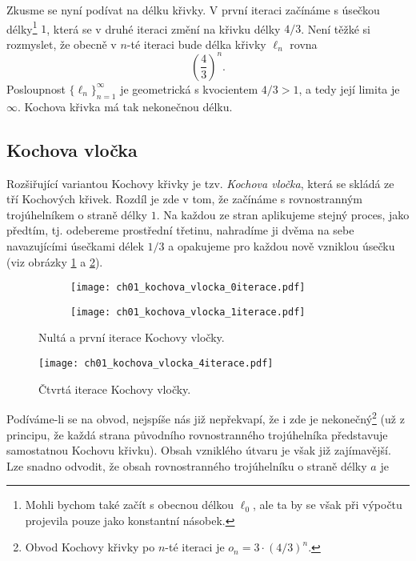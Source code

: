 Zkusme se nyní podívat na délku křivky. V první iteraci začínáme s úsečkou délky\footnote{Mohli bychom také začít s obecnou délkou $\ell_0$, ale ta by se však při výpočtu projevila pouze jako konstantní násobek.} $1$, která se v druhé iteraci změní na křivku délky $4/3$. Není těžké si rozmyslet, že obecně v $n$-té iteraci bude délka křivky $\ell_n$ rovna
\begin{equation*}
    \left(\dfrac{4}{3}\right)^{n}.
\end{equation*}
Posloupnost $\{\ell_n\}_{n=1}^{\infty}$ je geometrická s kvocientem $4/3>1$, a tedy její limita je $\infty$. Kochova křivka má tak nekonečnou délku.


\subsection{Kochova vločka}\label{subsec:kochova_vlocka}
Rozšiřující variantou Kochovy křivky je tzv. \emph{Kochova vločka}, která se skládá ze tří Kochových křivek. Rozdíl je zde v tom, že začínáme s rovnostranným trojúhelníkem o straně délky $1$. Na každou ze stran aplikujeme stejný proces, jako předtím, tj. odebereme prostřední třetinu, nahradíme ji dvěma na sebe navazujícími úsečkami délek $1/3$ a opakujeme pro každou nově vzniklou úsečku (viz obrázky \ref{fig:kochova_vlocka_dve_iterace} a \ref{fig:kochova_krivka_5iterace}).
\begin{figure}[h]
    \centering
    \begin{subfigure}{\subfigwidth}
        \centering
        \texttt{[image: ch01\_kochova\_vlocka\_0iterace.pdf]}
    \end{subfigure}
    \qquad
    \begin{subfigure}{\subfigwidth}
        \centering
        \texttt{[image: ch01\_kochova\_vlocka\_1iterace.pdf]}
    \end{subfigure}
    \caption{Nultá a první iterace Kochovy vločky.}
    \label{fig:kochova_vlocka_dve_iterace}
\end{figure}
\begin{figure}[h]
    \centering
    \texttt{[image: ch01\_kochova\_vlocka\_4iterace.pdf]}
    \caption{Čtvrtá iterace Kochovy vločky.}
    \label{fig:kochova_krivka_5iterace}
\end{figure}
Podíváme-li se na obvod, nejspíše nás již nepřekvapí, že i zde je nekonečný\footnote{Obvod Kochovy křivky po $n$-té iteraci je $o_n=3\cdot(4/3)^{n}$.} (už z principu, že každá strana původního rovnostranného trojúhelníka představuje samostatnou Kochovu křivku). Obsah vzniklého útvaru je však již zajímavější. Lze snadno odvodit, že obsah rovnostranného trojúhelníku o straně délky $a$ je
